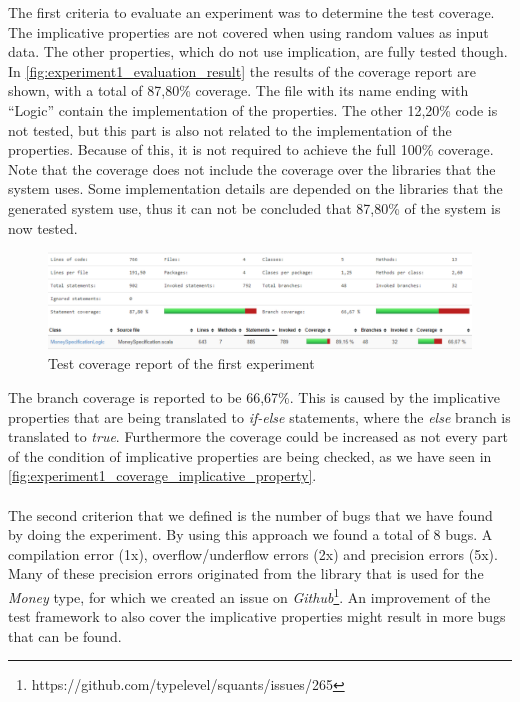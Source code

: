 The first criteria to evaluate an experiment was to determine the test
coverage. The implicative properties are not covered when using random
values as input data. The other properties, which do not use implication, are
fully tested though. In \autoref{fig:experiment1_evaluation_result} the results of the coverage report are shown, with a total of 87,80\% coverage. The file with its name
ending with ``Logic'' contain the implementation of the properties. The other 12,20\% code is not tested, but this part is also not related to the implementation of the properties. Because of this, it is not required to achieve the full 100\% coverage. Note that the coverage does not include the coverage over the libraries that the system uses. Some implementation details are depended on the libraries that the generated system use, thus it can not be concluded that 87,80\% of the system is now tested.
\FloatBarrier
\begin{figure}[!ht]
	\includegraphics[width=\linewidth]{figures/eval_e1}
\caption{Test coverage report of the first experiment}
\label{fig:experiment1_evaluation_result}
\centering
\end{figure}
\FloatBarrier
The branch coverage is reported to be 66,67\%. This is caused by the implicative properties that are being translated to \textit{if-else} statements, where the \textit{else} branch is translated to \textit{true}. Furthermore the coverage could be increased as not every part of the condition of implicative properties are being checked, as we have seen in \autoref{fig:experiment1_coverage_implicative_property}.\\
\\
The second criterion that we defined is the number of bugs that we have found
by doing the experiment. By using this approach we found a total of 8 bugs. A
compilation error (1x), overflow/underflow errors (2x) and precision errors (5x). Many of these
precision errors originated from the library that is used for the \textit{Money}
type, for which we created an issue on
\textit{Github}\footnote{https://github.com/typelevel/squants/issues/265}. An
improvement of the test framework to also cover the implicative properties might
result in more bugs that can be found.

